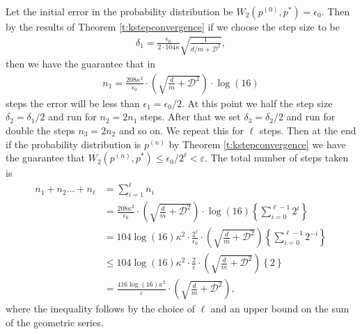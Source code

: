 \begin{Proof} Let the initial error in the probability distribution be $W_2(p^{(0)},p^*) = \epsilon_0$. Then by the results of Theorem \ref{t:kstepconvergence} if we choose the step size to be
\begin{align*}
\delta_1 = \frac{\epsilon_0 }{2\cdot 104 \kappa} \sqrt{\frac{1}{d/m + \mathcal{D}^2}},
\end{align*}
then we have the guarantee that in 
\begin{align*}
n_1 = \frac{208 \kappa^2}{ \epsilon_0}\cdot\left(\sqrt{\frac{d}{m}+ \mathcal{D}^2}\right)\cdot \log(16)
\end{align*}
steps the error will be less than $\epsilon_1 = \epsilon_0/2$. At this point we half the step size $\delta_2 = \delta_1/2$ and run for $n_2 = 2 n_1$ steps. After that we set $\delta_3 = \delta_2/2$ and run for double the steps $n_3= 2 n_2$ and so on. We repeat this for $\ell$ steps. Then at the end if the probability distribution is $p^{(n)}$ by Theorem \ref{t:kstepconvergence} we have the guarantee that $W_2(p^{(n)},p^*) \le \epsilon_0/2^{\ell}<\varepsilon$. The total number of steps taken is 
\begin{align*}
n_1+ n_2 \ldots + n_{\ell}& = \sum_{i=1}^{\ell} n_{i}\\
& = \frac{208\kappa^2}{ \epsilon_0}\cdot \left( \sqrt{\frac{d}{m}+ \mathcal{D}^2}\right)\cdot \log(16) \left\{ \sum_{i=0}^{\ell-1} 2^i\right\}\\
& = 104 \log(16)\kappa^2 \cdot\frac{2^{\ell}}{\epsilon_0}\cdot \left( \sqrt{\frac{d}{m}+ \mathcal{D}^2}\right)\left\{ \sum_{i=0}^{\ell-1} 2^{-i}\right\}\\
& \le 104 \log(16)\kappa^2\cdot\frac{2}{\varepsilon}\cdot \left( \sqrt{\frac{d}{m}+ \mathcal{D}^2}\right)\left\{ 2\right\}\\
& = \frac{416 \log(16)\kappa^2}{\varepsilon}\cdot \left( \sqrt{\frac{d}{m}+ \mathcal{D}^2}\right),
\end{align*}
where the inequality follows by the choice of $\ell$ and an upper bound on the sum of the geometric series.
\end{Proof} 